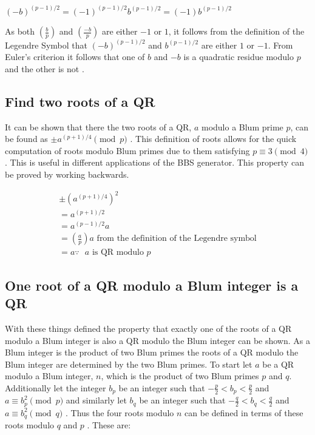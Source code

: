 \documentclass{article}
\begin{document}
$(-b)^{(p-1)/2}=(-1)^{(p-1)/2} b^{(p-1)/2}=(-1) b^{(p-1)/2}$

As both $\left(\frac{b}{p}\right)$ and $\left(\frac{-b}{p}\right)$ are either $-1$ or $1$, it follows from the definition of the Legendre Symbol that $(-b)^{(p-1)/2}$ and $b^{(p-1)/2}$ are either $1$ or $-1$. From Euler's criterion it follows that one of $b$ and $-b$ is a quadratic residue modulo $p$ and the other is not \cite{Fischer2017}.

\subsection{Find two roots of a QR}

It can be shown that there the two roots of a QR, $a$ modulo a Blum prime $p$, can be found as $\pm a^{(p+1)/4} \pmod{p}$ \cite{Mora2013}. This definition of roots allows for the quick computation of roots modulo Blum primes due to them satisfying $p \equiv 3 \pmod{4}$ \cite{Blum1986}. This is useful in different applications of the BBS generator. This property can be proved by working backwards.

$$
\begin{array}{l}
\pm (a^{(p+1)/4})^2 \\
= a^{(p+1)/2} \\
= a^{(p-1)/2}  a \\
= \left(\frac{a}{p}\right)  a \mbox{ from the definition of the Legendre symbol} \\
= a \because \mbox{ $a$ is QR modulo $p$}
\end{array}
$$

\subsection{One root of a QR modulo a Blum integer is a QR}

With these things defined the property that exactly one of the roots of a QR modulo a Blum integer is also a QR modulo the Blum integer can be shown. As a Blum integer is the product of two Blum primes the roots of a QR modulo the Blum integer are determined by the two Blum primes. To start let $a$ be a QR modulo a Blum integer, $n$, which is the product of two Blum primes $p$ and $q$. Additionally let the integer $b_p$ be an integer such that $-\frac{p}{2} < b_p < \frac{p}{2}$ and $a \equiv b_p^2 \pmod{p}$ and similarly let $b_q$ be an integer such that $-\frac{q}{2} < b_q < \frac{q}{2}$ and $a \equiv b_q^2 \pmod{q}$ \cite{Mora2013}. Thus the four roots modulo $n$ can be defined in terms of these roots modulo $q$ and $p$ \cite{Mora2013}. These are:
\end{document}
